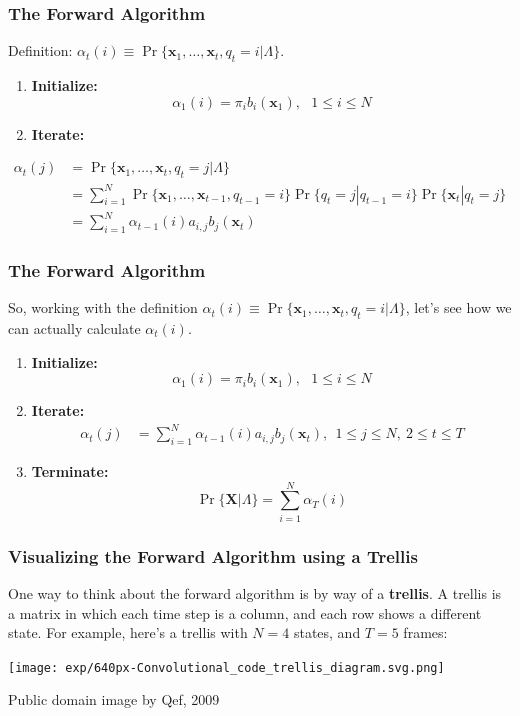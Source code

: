 \documentclass{beamer}
\begin{document}
\begin{frame}
  \frametitle{The Forward Algorithm}

  Definition: $\alpha_t(i) \equiv \Pr\{\mathbf{x}_1,\ldots,\mathbf{x}_t,q_t=i|\Lambda\}$.
  \begin{enumerate}
  \item {\bf Initialize:}
    \[
    \alpha_1(i) = \pi_i b_i(\mathbf{x}_1),~~~1\le i\le N
    \]
  \item {\bf Iterate:}
  \end{enumerate}
  \begin{align*}
    \alpha_{t}(j) &= \Pr\{\mathbf{x}_1,\ldots,\mathbf{x}_t,q_t=j|\Lambda\}\\
    &= \sum_{i=1}^N \Pr\{\mathbf{x}_1,\ldots,\mathbf{x}_{t-1},q_{t-1}=i\}\Pr\{q_t=j|q_{t-1}=i\}\Pr\{\mathbf{x}_t|q_t=j\}\\
    &= \sum_{i=1}^N \alpha_{t-1}(i) a_{i,j}b_j(\mathbf{x}_t)
  \end{align*}
\end{frame}
  
\begin{frame}
  \frametitle{The Forward Algorithm}

  So, working with the definition $\alpha_t(i) \equiv
  \Pr\{\mathbf{x}_1,\ldots,\mathbf{x}_t,q_t=i|\Lambda\}$, let's see how we can
  actually calculate $\alpha_t(i)$.
  \begin{enumerate}
  \item {\bf Initialize:}
    \[
    \alpha_1(i) = \pi_i b_i(\mathbf{x}_1),~~~1\le i\le N
    \]
  \item {\bf Iterate:}
    \begin{align*}
      \alpha_{t}(j) &= \sum_{i=1}^N \alpha_{t-1}(i) a_{i,j}b_j(\mathbf{x}_t),~~1\le j\le N,~2\le t\le T
    \end{align*}
  \item {\bf Terminate:}
    \[
    \Pr\{\mathbf{X}|\Lambda\} = \sum_{i=1}^N \alpha_T(i)
    \]
  \end{enumerate}
\end{frame}

\begin{frame}
  \frametitle{Visualizing the Forward Algorithm using a Trellis}

  One way to think about the forward algorithm is by way of a {\bf
    trellis}.  A trellis is a matrix in which each time step is a
  column, and each row shows a different state.  For example, here's a
  trellis with $N=4$ states, and $T=5$ frames:
  
  \centerline{\texttt{[image: exp/640px-Convolutional\_code\_trellis\_diagram.svg.png]}}
  \centerline{\small Public domain image by Qef, 2009}
\end{frame}
\end{document}
